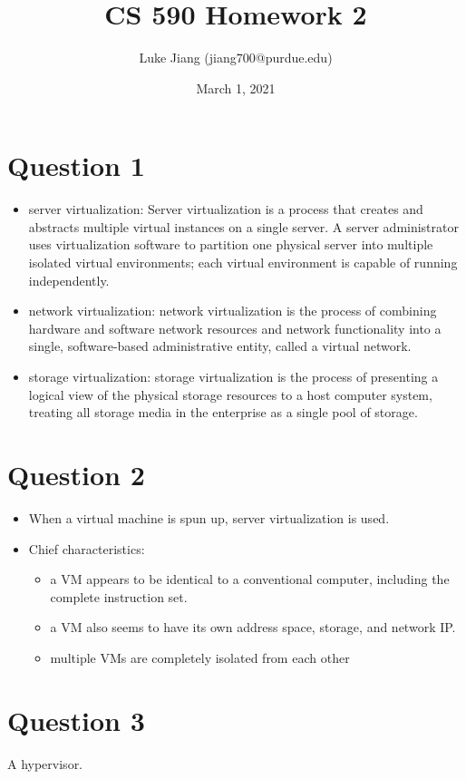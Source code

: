 \documentclass{article}
\title{CS 590 Homework 2}
\author{Luke Jiang (jiang700@purdue.edu) }
\date{March 1, 2021}
\begin{document}
\maketitle

\section{Question 1}
\begin{itemize}
\item server virtualization: Server virtualization is a process that creates and abstracts multiple virtual instances on a single server. A server administrator uses virtualization software to partition one physical server into multiple isolated virtual environments; each virtual environment is capable of running independently. 
\item network virtualization: network virtualization is the process of combining hardware and software network resources and network functionality into a single, software-based administrative entity, called a virtual network.
\item storage virtualization: storage virtualization is the process of presenting a logical view of the physical storage resources to a host computer system, treating all storage media in the enterprise as a single pool of storage.
\end{itemize}

\section{Question 2}
\begin{itemize}
\item When a virtual machine is spun up, server virtualization is used.
\item Chief characteristics:
    \begin{itemize}
    \item a VM appears to be identical to a conventional computer, including the complete instruction set.
    \item a VM also seems to have its own address space, storage, and network IP.
    \item multiple VMs are completely isolated from each other
    \end{itemize}
\end{itemize}

\section{Question 3}
A hypervisor.
\end{document}
